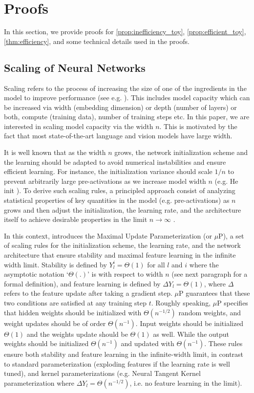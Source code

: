 \section{Proofs}\label{app:proofs}
In this section, we provide proofs for \cref{prop:inefficiency_toy}, \cref{prop:efficient_toy}, \cref{thm:efficiency}, and some technical details used in the proofs.

\subsection{Scaling of Neural Networks}\label{sec:scaling}
Scaling refers to the process of increasing the size of one of the ingredients in the model to improve performance (see e.g. \cite{hoffmann2022training}). This includes model capacity which can be increased via width (embedding dimension) or depth (number of layers) or both, compute (training data), number of training steps etc. In this paper, we are interested in scaling model capacity via the width $n$. This is motivated by the fact that most state-of-the-art language and vision models have large width.

It is well known that as the width $n$ grows, the network initialization scheme and the learning should be adapted to avoid numerical instabilities and ensure efficient learning. For instance, the initialization variance should scale $1/n$ to prevent arbitrarily large pre-activations as we increase model width $n$ (e.g. He init \cite{he2016deep}). To derive such scaling rules, a principled approach consist of analyzing statistical properties of key quantities in the model (e.g. pre-activations) as $n$ grows and then adjust the initialization, the learning rate, and the architecture itself to achieve desirable properties in the limit $n \to \infty$ \cite{hayou19activation, deepinfoprop2017, yang2019scaling}.

In this context, \cite{yang2022tensor} introduces the Maximal Update Parameterization (or $\mu$P), a set of scaling rules for the initialization scheme, the learning rate, and the network architecture that ensure stability and maximal feature learning in the infinite width limit. Stability is defined by $Y_l^i = \Theta(1)$ for all $l$ and $i$ where the asymptotic notation `$\Theta(.)$' is with respect to width $n$ (see next paragraph for a formal definition), and feature learning is defined by $\Delta Y_l = \Theta(1)$, where $\Delta$ refers to the feature update after taking a gradient step. $\mu$P guarantees that these two conditions are satisfied at any training step $t$. Roughly speaking, $\mu$P specifies that hidden weights should be initialized with $\Theta(n^{-1/2})$ random weights, and weight updates should be of order $\Theta(n^{-1})$. Input weights should be initialized $\Theta(1)$ and the weights update should be $\Theta(1)$ as well. While the output weights should be initialized $\Theta(n^{-1})$ and updated with $\Theta(n^{-1})$. These rules ensure both stability and feature learning in the infinite-width limit, in contrast to standard parameterization (exploding features if the learning rate is well tuned), and kernel parameterizations (e.g. Neural Tangent Kernel parameterization where $\Delta Y_l = \Theta(n^{-1/2})$, i.e. no feature learning in the limit). 

